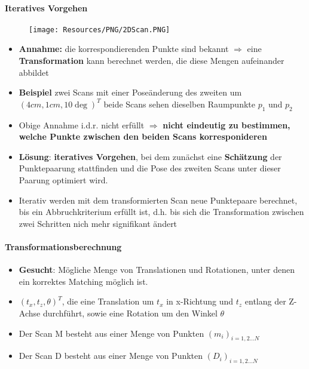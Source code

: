 \paragraph{Iteratives Vorgehen}
\begin{figure}[H]
	\begin{center}
		\texttt{[image: Resources/PNG/2DScan.PNG]}
		\caption{}
		\label{fig:PNG/2DScan.PNG}
	\end{center}
\end{figure}
\begin{itemize}
	\item \textbf{Annahme:} die korrespondierenden Punkte sind bekannt
		$\Rightarrow$ eine \textbf{Transformation} kann berechnet werden, die
		diese Mengen aufeinander abbildet
	\item \textbf{Beispiel} zwei Scans mit einer Poseänderung des zweiten um
		$(4cm, 1cm, 10 \deg)^T$ beide Scans sehen dieselben Raumpunkte $p_1$ und
		$p_2$
	\item Obige Annahme i.d.r. nicht erfüllt $\Rightarrow$ \textbf{nicht
		eindeutig zu bestimmen, welche Punkte zwischen den beiden Scans
		korresponideren}
	\item \textbf{Lösung}: \textbf{iteratives Vorgehen}, bei dem zunächst eine
		\textbf{Schätzung} der Punktepaarung stattfinden und die Pose des zweiten
		Scans unter dieser Paarung optimiert wird.
	\item Iterativ werden mit dem transformierten Scan neue Punktepaare
		berechnet, bis ein Abbruchkriterium erfüllt ist, d.h. bis sich die
		Transformation zwischen zwei Schritten nich mehr signifikant ändert
\end{itemize}

\paragraph{Transformationsberechnung}
\begin{itemize}
	\item \textbf{Gesucht}: Mögliche Menge von Translationen und Rotationen,
		unter denen ein korrektes Matching möglich ist.
	\item $(t_x, t_z, \theta)^T$, die eine Translation um $t_x$ in x-Richtung
		und $t_z$ entlang der Z-Achse durchführt, sowie eine Rotation um den
		Winkel $\theta$
	\item Der Scan M besteht aus einer Menge von Punkten $(m_i)_{i=1,2 \dots N}$
	\item Der Scan D besteht aus einer Menge von Punkten $(D_i)_{i=1,2 \dots N}$
\end{itemize}

